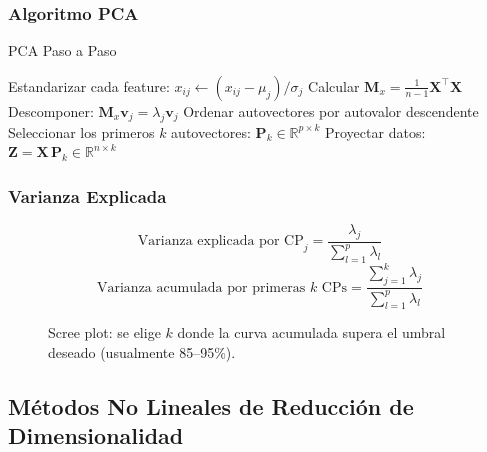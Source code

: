 \documentclass[12pt, a4paper]{article}
\newcommand{\R}{\mathbb{R}}
\begin{document}
\subsubsection{Algoritmo PCA}

\begin{algbox}{PCA Paso a Paso}
\begin{algorithmic}[1]
  \State Estandarizar cada feature: $x_{ij} \leftarrow (x_{ij} - \mu_j)/\sigma_j$
  \State Calcular $\mathbf{M}_x = \frac{1}{n-1}\mathbf{X}^\top\mathbf{X}$
  \State Descomponer: $\mathbf{M}_x \mathbf{v}_j = \lambda_j \mathbf{v}_j$
  \State Ordenar autovectores por autovalor descendente
  \State Seleccionar los primeros $k$ autovectores: $\mathbf{P}_k \in \R^{p\times k}$
  \State Proyectar datos: $\mathbf{Z} = \mathbf{X}\,\mathbf{P}_k \in \R^{n\times k}$
\end{algorithmic}
\end{algbox}

\subsubsection{Varianza Explicada}

\[
  \text{Varianza explicada por CP}_j = \frac{\lambda_j}{\sum_{l=1}^p \lambda_l}
\]
\[
  \text{Varianza acumulada por primeras } k \text{ CPs} = \frac{\sum_{j=1}^k \lambda_j}{\sum_{l=1}^p \lambda_l}
\]

\begin{figure}[H]
\centering
{}
\caption{Scree plot: se elige $k$ donde la curva acumulada supera el umbral deseado
         (usualmente 85–95\%).}
\end{figure}

\subsection{Métodos No Lineales de Reducción de Dimensionalidad}
\end{document}
